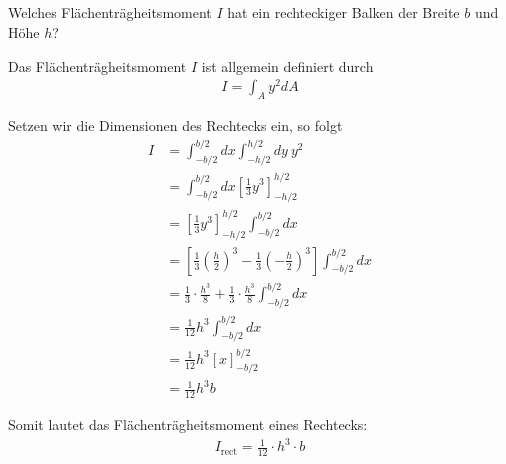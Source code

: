 \subsection{}

\begin{tcolorbox}[task]
    Welches Flächenträgheitsmoment $I$ hat ein rechteckiger Balken der Breite $b$ und Höhe $h$?
\end{tcolorbox}

Das Flächenträgheitsmoment $I$ ist allgemein definiert durch
\begin{align}
I = \int_{A} y^{2} dA 
\label{eq:def-flaechentraegheitsmoment}
\end{align}

Setzen wir die Dimensionen des Rechtecks ein, so folgt
\begin{align*}
    I &= \int_{-b/2}^{b/2} dx \int_{-h/2}^{h/2} dy ~ y^{2} \\
      &= \int_{-b/2}^{b/2} dx \left[\frac{1}{3} y^3 \right]_{-h/2}^{h/2} \\
      &= \left[\frac{1}{3} y^3 \right]_{-h/2}^{h/2} \int_{-b/2}^{b/2} dx \\
      &= \left[\frac{1}{3} \left(\frac{h}{2} \right)^{3} - \frac{1}{3} \left(-\frac{h}{2} \right)^{3} \right] \int_{-b/2}^{b/2} dx \\
      &= \frac{1}{3} \cdot \frac{h^{3}}{8} + \frac{1}{3} \cdot \frac{h^{3}}{8} \int_{-b/2}^{b/2} dx \\
      &= \frac{1}{12} h^{3} \int_{-b/2}^{b/2} dx \\
      &= \frac{1}{12} h^{3} \left[x \right]_{-b/2}^{b/2}\\ 
      &= \frac{1}{12} h^{3} b
\end{align*}

\begin{tcolorbox}[result]
    Somit lautet das Flächenträgheitsmoment eines Rechtecks:
    \begin{align}
        I_{\text{rect}} = \frac{1}{12} \cdot h^{3} \cdot b
        \label{eq:flaechentraegheitsmoment-rechteck}
    \end{align}
\end{tcolorbox}